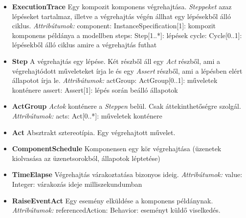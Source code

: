\begin{itemize}
	\item \textbf{ExecutionTrace} \newline
	Egy kompozit komponens végrehajtása. \textit{Steppeket} azaz lépéseket tartalmaz, illetve a végrehajtás végén állhat egy lépésekből álló ciklus.
	\newline
	\textit{Attribútumok:}
	\subitem component: InstanceSpecification[1]: kompozit komponens példánya a modellben
	\subitem steps: Step[1..*]: lépések
	\subitem cycle: Cycle[0..1]: lépésekből álló ciklus amire a végrehajtás futhat
	
	\item \textbf{Step} \newline
	A végrehajtás egy lépése. Két részből áll egy \textit{Act} részből, ami a végrehajtódott műveleteket írja le és egy \textit{Assert} részből, ami a lépésben elért állapotot írja le.
	\newline
	\textit{Attribútumok:}
	\subitem actGroup: ActGroup[0..1]: műveletek konténere
	\subitem assert: Assert[1]: lépés során beálló állapotok
	
	\item \textbf{ActGroup} \newline
	\textit{Actok} konténere a \textit{Steppen} belül. Csak áttekinthetőségre szolgál.
	\newline
	\textit{Attribútumok:}
	\subitem acts: Act[0..*]: műveletek konténere
	
	\item \textbf{Act} \newline
	Absztrakt sztereotípia. Egy végrehajtott művelet.
	
	\item \textbf{ComponentSchedule} \newline
	Komponensen egy kör végrehajtása (üzenetek kiolvasása az üzenetsorokból, állapotok léptetése)
	
	\item \textbf{TimeElapse} \newline
	Végrehajtás várakoztatása bizonyos ideig.
	\newline
	\textit{Attribútumok:}
	\subitem value: Integer: várakozás ideje milliszekundumban
	
	\item \textbf{RaiseEventAct} \newline
	Egy esemény elküldése a komponens példánynak.
	\newline
	\textit{Attribútumok:}
	\subitem referencedAction: Behavior: eseményt küldő viselkedés.
	

\end{itemize}

